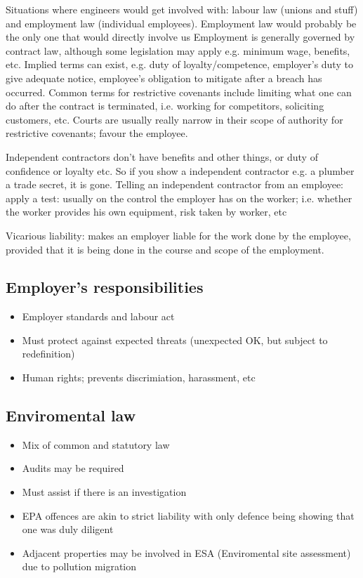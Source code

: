 \documentclass[10pt]{article}
\begin{document}
Situations where engineers would get involved with: labour law (unions and stuff) and employment law (individual employees). 
Employment law would probably be the only one that would directly involve us
Employment is generally governed by contract law, although some legislation may apply e.g. minimum wage, benefits, etc.
Implied terms can exist, e.g. duty of loyalty/competence, employer's duty to give adequate notice, employee's obligation to mitigate after a breach has occurred. 
Common terms for restrictive covenants include limiting what one can do after the contract is terminated, i.e. working for competitors, soliciting customers, etc.
Courts are usually really narrow in their scope of authority for restrictive covenants; favour the employee.


Independent contractors don't have benefits and other things, or duty of confidence or loyalty etc. So if you show a independent contractor e.g. a plumber a trade secret, it is gone.
Telling an independent contractor from an employee: apply a test: usually on the control the employer has on the worker; i.e. whether the worker provides his own equipment, risk taken by worker, etc

Vicarious liability: makes an employer liable for the work done by the employee, provided that it is being done in the course and scope of the employment.


\subsection{Employer's responsibilities}
\begin{itemize}
	\item Employer standards and labour act
	\item Must protect against expected threats (unexpected OK, but subject to redefinition)
	\item Human rights; prevents discrimiation, harassment, etc
\end{itemize}

\subsection{Enviromental law}
\begin{itemize}
	\item Mix of common and statutory law
	\item Audits may be required
	\item Must assist if there is an investigation
	\item 	EPA offences are akin to strict liability with only defence being showing that one was duly diligent
	\item Adjacent properties may be involved in ESA (Enviromental site assessment) due to pollution migration
\end{itemize}
\end{document}
